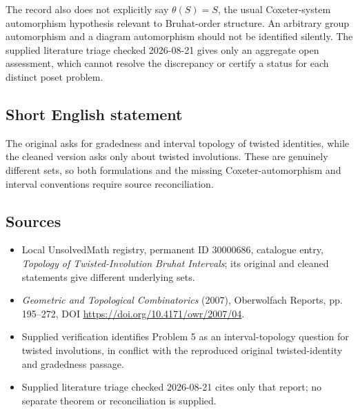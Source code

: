 \documentclass[11pt]{article}
\begin{document}
The record also does not explicitly say \(\theta(S)=S\), the usual Coxeter-system automorphism hypothesis relevant to Bruhat-order structure. An arbitrary group automorphism and a diagram automorphism should not be identified silently. The supplied literature triage checked 2026-08-21 gives only an aggregate open assessment, which cannot resolve the discrepancy or certify a status for each distinct poset problem.
\subsection{Short English statement}
The original asks for gradedness and interval topology of twisted identities, while the cleaned version asks only about twisted involutions. These are genuinely different sets, so both formulations and the missing Coxeter-automorphism and interval conventions require source reconciliation.
\subsection{Sources}
\begin{itemize}
\item Local UnsolvedMath registry, permanent ID 30000686, catalogue entry, \emph{Topology of Twisted-Involution Bruhat Intervals}; its original and cleaned statements give different underlying sets.
\item \emph{Geometric and Topological Combinatorics} (2007), Oberwolfach Reports, pp. 195--272, DOI \url{https://doi.org/10.4171/owr/2007/04}.
\item Supplied verification identifies Problem 5 as an interval-topology question for twisted involutions, in conflict with the reproduced original twisted-identity and gradedness passage.
\item Supplied literature triage checked 2026-08-21 cites only that report; no separate theorem or reconciliation is supplied.
\end{itemize}
\end{document}
